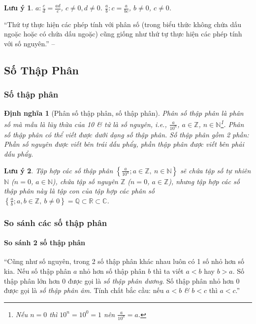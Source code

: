 \documentclass{article}
\numberwithin{equation}{section}
\newtheorem{dinhnghia}{Định nghĩa}[section]
\newtheorem{luuy}{Lưu ý}[section]
\begin{document}
\begin{luuy}
	$a:\frac{c}{d} = \frac{ad}{c}$, $c\ne 0,d\ne 0$. $\frac{a}{b}:c = \frac{a}{bc}$, $b\ne 0$, $c\ne 0$.
\end{luuy}
``Thứ tự thực hiện các phép tính với phân số (trong biểu thức không chứa dấu ngoặc hoặc có chứa dấu ngoặc) cũng giống như thứ tự thực hiện các phép tính với số nguyên.'' -- \cite[p. 42]{SGK_Toan_6_Canh_Dieu_tap_2}


\subsection{Số Thập Phân}

\subsubsection{Số thập phân}

\begin{dinhnghia}[Phân số thập phân, số thập phân]
	\emph{Phân số thập phân} là phân số mà mẫu là lũy thừa của 10 \textit{\&} tử là số nguyên, i.e., $\frac{a}{10^n}$, $a\in\mathbb{Z}$, $n\in\mathbb{N}$\footnote{Nếu $n = 0$ thì $10^n = 10^0 = 1$ nên $\frac{a}{10^n} = a$.}. Phân số thập phân có thể viết được dưới dạng số thập phân. Số thập phân gồm 2 phần: \emph{Phần số nguyên} được viết bên trái dấu phẩy, \emph{phần thập phân} được viết bên phải dấu phẩy.
\end{dinhnghia}

\begin{luuy}
	Tập hợp các số thập phân $\left\{\frac{a}{10^n};a\in\mathbb{Z},\ n\in\mathbb{N}\right\}$ sẽ chứa tập số tự nhiên $\mathbb{N}$ ($n = 0$, $a\in\mathbb{N}$), chứa tập số nguyên $\mathbb{Z}$ ($n = 0$, $a\in\mathbb{Z}$), nhưng tập hợp các số thập phân này là tập con của tập hợp các phân số $\left\{\frac{a}{b};a,b\in\mathbb{Z},\ b\ne 0\right\} = \mathbb{Q}\subset\mathbb{R}\subset\mathbb{C}$.
\end{luuy}

\subsubsection{So sánh các số thập phân}

\paragraph{So sánh 2 số thập phân}
``Cũng như số nguyên, trong 2 số thập phân khác nhau luôn có 1 số nhỏ hơn số kia. Nếu số thập phân $a$ nhỏ hơn số thập phân $b$ thì ta viết $a < b$ hay $b > a$. Số thập phân lớn hơn 0 được gọi là \emph{số thập phân dương}. Số thập phân nhỏ hơn 0 được gọi là \emph{số thập phân âm}. Tính chất bắc cầu: nếu $a < b$ \textit{\&} $b < c$ thì $a < c$.'' \cite[p. 45]{SGK_Toan_6_Canh_Dieu_tap_2}
\end{document}
